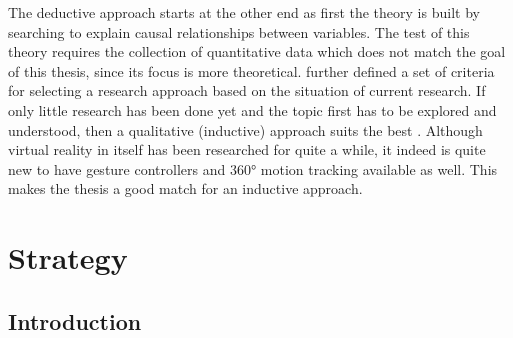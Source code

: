 The deductive approach starts at the other end as first the theory is built by searching to explain causal relationships between variables. The test of this theory requires the collection of quantitative data which does not match the goal of this thesis, since its focus is more theoretical. \newline
\cite{Creswell2014} further defined a set of criteria for selecting a research approach based on the situation of current research. If only little research has been done yet and the topic first has to be explored and understood, then a qualitative (inductive) approach suits the best \citep[pg 50]{Creswell2014}. Although virtual reality in itself has been researched for quite a while, it indeed is quite new to have gesture controllers and 360° motion tracking available as well. This makes the thesis a good match for an inductive approach.



\section{Strategy}


\subsection{Introduction}

